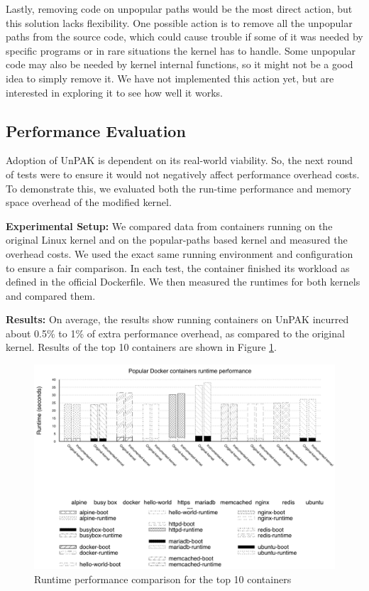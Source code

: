 Lastly, removing code on unpopular paths would be the most direct action, but this solution lacks flexibility. 
One possible action is to remove all the unpopular paths from the source code, which could cause trouble if some of it was needed by specific programs or 
in rare situations the kernel has to handle. Some unpopular code may also be needed by kernel internal functions, so it might not be a good idea to simply remove it. 
We have not implemented this action yet, but are interested in exploring it to see how well it works. 

\subsection{Performance Evaluation}
\label{sec.evaluation.4} 
Adoption of UnPAK is dependent on its real-world viability. So, the next round of tests were to ensure it would not negatively affect performance overhead costs. 
To demonstrate this, we evaluated both the run-time performance and memory space overhead of the modified kernel.

\textbf{Experimental Setup:} We compared data from containers running on the original Linux kernel and on the popular-paths based kernel and measured the overhead costs. 
We used the exact same running environment and configuration to ensure a fair comparison. In each test, the container finished its workload as defined in the official Dockerfile. 
We then measured the runtimes for both kernels and compared them. 

\textbf{Results:} On average, the results show running containers on UnPAK incurred about 0.5\% to 1\% of extra performance overhead, as compared to the original kernel. 
Results of the top 10 containers are shown in Figure \ref{fig:performance}.

\begin{figure}
\centering
\includegraphics[width=1.5\columnwidth]{diagram/performance.png}
\caption{\small Runtime performance comparison for the top 10 containers}
\label{fig:performance}
\end{figure}

